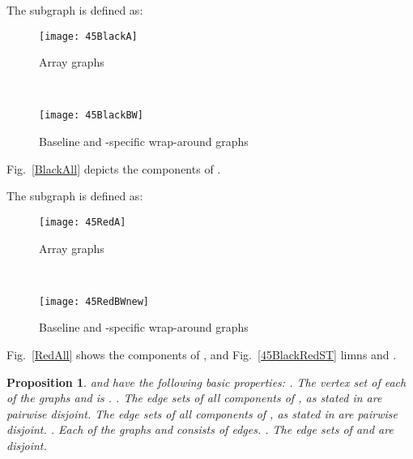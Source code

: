 \documentclass[12pt,journal,compsoc,onecolumn,]{IEEEtran}
\newtheorem{proposition}[theorem]{Proposition}
\begin{document}
{\bigskip
The subgraph  is defined as: \begin{figure*}[ht!]
    \centering
    \begin{subfigure}[b]{0.5\textwidth}
        \centering
        \texttt{[image: 45BlackA]}
        \caption{Array graphs}
    \end{subfigure}~
    \begin{subfigure}[b]{0.5\textwidth}
        \centering
        \texttt{[image: 45BlackBW]}
        \caption{Baseline and -specific wrap-around graphs}
    \end{subfigure}
    \caption{ components ()}
    \label{BlackAll}
\end{figure*} 


\bigskip Fig.~\ref{BlackAll} depicts the components of .

\bigskip The subgraph  is defined as: \begin{figure*}[t!]
    \centering
    \begin{subfigure}[b]{0.5\textwidth}
        \centering
        \texttt{[image: 45RedA]}
        \caption{Array graphs}
    \end{subfigure}~
    \begin{subfigure}[b]{0.5\textwidth}
        \centering
        \texttt{[image: 45RedBWnew]}
        \caption{Baseline and -specific wrap-around graphs}
    \end{subfigure}
    \caption{ components ()}
    \label{RedAll}
\end{figure*} 


\bigskip Fig.~\ref{RedAll} shows the components of , and Fig.~\ref{45BlackRedST} limns  and .

\bigskip
\begin{proposition}
\label{BasicRB}  and  have the following basic properties:
. The vertex set of each of the graphs  and  is .
. The edge sets of all components of , as stated in
 are pairwise disjoint. The edge sets of all components of ,
as stated in  are pairwise disjoint.
. Each of the graphs  and  consists of  edges.
. The edge sets of  and  are disjoint.
\end{proposition}

}
\end{document}

